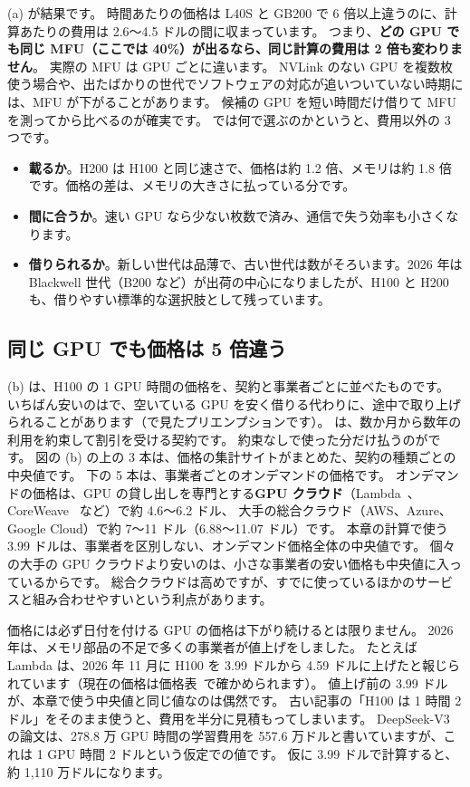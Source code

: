 (a) が結果です。
時間あたりの価格は L40S と GB200 で 6 倍以上違うのに、計算あたりの費用は 2.6〜4.5 ドルの間に収まっています。
つまり、\textbf{どの GPU でも同じ MFU（ここでは 40\%）が出るなら、同じ計算の費用は 2 倍も変わりません}。
実際の MFU は GPU ごとに違います。
NVLink のない GPU を複数枚使う場合や、出たばかりの世代でソフトウェアの対応が追いついていない時期には、MFU が下がることがあります。
候補の GPU を短い時間だけ借りて MFU を測ってから比べるのが確実です。
では何で選ぶのかというと、費用以外の 3 つです。
\begin{itemize}
\item \textbf{載るか}。H200 は H100 と同じ速さで、価格は約 1.2 倍、メモリは約 1.8 倍です。価格の差は、メモリの大きさに払っている分です。
\item \textbf{間に合うか}。速い GPU なら少ない枚数で済み、通信で失う効率も小さくなります。
\item \textbf{借りられるか}。新しい世代は品薄で、古い世代は数がそろいます。2026 年は Blackwell 世代（B200 など）が出荷の中心になりましたが、H100 と H200 も、借りやすい標準的な選択肢として残っています。
\end{itemize}

\subsection*{同じ GPU でも価格は 5 倍違う}

(b) は、H100 の 1 GPU 時間の価格を、契約と事業者ごとに並べたものです。
いちばん安いのはで、空いている GPU を安く借りる代わりに、途中で取り上げられることがあります（で見たプリエンプションです）。
は、数か月から数年の利用を約束して割引を受ける契約です。
約束なしで使った分だけ払うのがです。
図の (b) の上の 3 本は、価格の集計サイトがまとめた、契約の種類ごとの中央値です。
下の 5 本は、事業者ごとのオンデマンドの価格です。
オンデマンドの価格は、GPU の貸し出しを専門とする\textbf{GPU クラウド}（Lambda~\cite{lambda2026gpu}、CoreWeave~\cite{coreweave2026cloud} など）で約 4.6〜6.2 ドル、
大手の総合クラウド（AWS、Azure、Google Cloud）で約 7〜11 ドル（6.88〜11.07 ドル）です。
本章の計算で使う 3.99 ドルは、事業者を区別しない、オンデマンド価格全体の中央値です。
個々の大手の GPU クラウドより安いのは、小さな事業者の安い価格も中央値に入っているからです。
総合クラウドは高めですが、すでに使っているほかのサービスと組み合わせやすいという利点があります。

\begin{caution}{価格には必ず日付を付ける}
GPU の価格は下がり続けるとは限りません。
2026 年は、メモリ部品の不足で多くの事業者が値上げをしました。
たとえば Lambda は、2026 年 11 月に H100 を 3.99 ドルから 4.59 ドルに上げたと報じられています（現在の価格は価格表~\cite{lambda2026gpu}で確かめられます）。
値上げ前の 3.99 ドルが、本章で使う中央値と同じ値なのは偶然です。
古い記事の「H100 は 1 時間 2 ドル」をそのまま使うと、費用を半分に見積もってしまいます。
DeepSeek-V3 の論文\cite{liu2024deepseekv3}は、278.8 万 GPU 時間の学習費用を 557.6 万ドルと書いていますが、これは 1 GPU 時間 2 ドルという仮定での値です。
仮に 3.99 ドルで計算すると、約 1,110 万ドルになります。
\end{caution}

